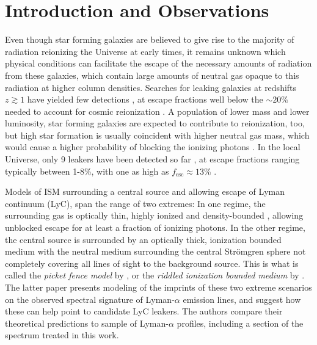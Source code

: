 \documentclass[twocolumn]{aastex61}
\begin{document}
\section{Introduction and
Observations}\label{introduction-and-observations}

Even though star forming galaxies are believed to give rise to the
majority of radiation reionizing the Universe at early times, it remains
unknown which physical conditions can facilitate the escape of the
necessary amounts of radiation from these galaxies, which contain large
amounts of neutral gas opaque to this radiation at higher column
densities. Searches for leaking galaxies at redshifts $z \gtrsim 1$ have
yielded few detections
\citep[e.g.][]{Iwata2009, Vanzella2010, Vanzella2012, Nestor2013, Cowie2009, Siana2010},
at escape fractions well below the $\sim 20\%$ needed to account for
cosmic reionization \citep{Bouwens2011, Robertson2013}. A population of
lower mass and lower luminosity, star forming galaxies are expected to
contribute to reionization, too, but high star formation is usually
coincident with higher neutral gas mass, which would cause a higher
probability of blocking the ionizing photons
\citep[e.g.][]{Erb2016, Robertson2013}. In the local Universe, only 9
leakers have been detected so far
\citetext{\citealp{Bergvall2006}; \citealp{Leitet2011}; \citealp{Leitet2013}; \citealp{Borthakur2014}; \citealp[Izotov2016Nat;][]{Izotov2016MNRAS}; \citealp{Leitherer2016}},
at escape fractions ranging typically between 1-8\%, with one as high as
$f_{\mathrm{esc}} \approx 13\%$ \citep{Izotov2016MNRAS}.

Models of ISM surrounding a central source and allowing escape of Lyman
continuum (LyC), span the range of two extremes: In one regime, the
surrounding gas is optically thin, highly ionized and density-bounded
\citep[see e.g.][]{Jaskot2013}, allowing unblocked escape for at least a
fraction of ionizing photons. In the other regime, the central source is
surrounded by an optically thick, ionization bounded medium with the
neutral medium surrounding the central Strömgren sphere not completely
covering all lines of sight to the background source. This is what is
called the \emph{picket fence model} by \citet{Heckman2011}, or the
\emph{riddled ionization bounded medium} by \citet{Verhamme2015}. The
latter paper presents modeling of the imprints of these two extreme
scenarios on the observed spectral signature of Lyman-$\alpha$ emission
lines, and suggest how these can help point to candidate LyC leakers.
The authors compare their theoretical predictions to sample of
Lyman-$\alpha$ profiles, including a section of the spectrum treated in
this work.
\end{document}
